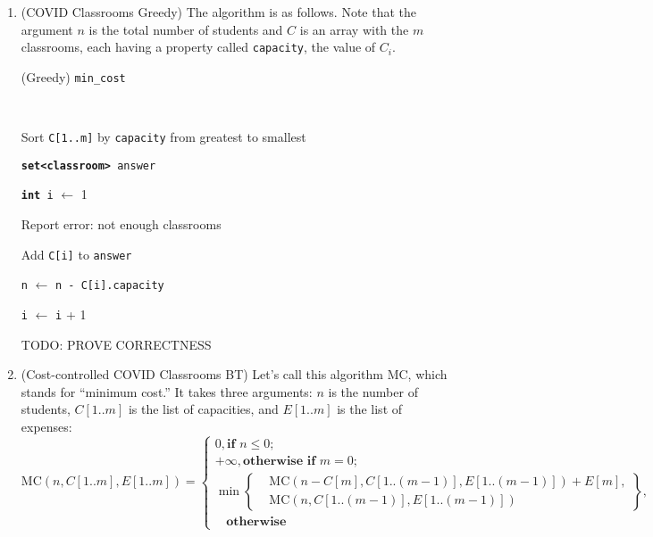 \documentclass{article}
\begin{document}
\begin{enumerate}
    \pagebreak

  \item (COVID Classrooms Greedy) The algorithm is as follows. Note that the argument $n$ is the total number of students and $C$ is an array with the $m$ classrooms, each having a property called \texttt{capacity}, the value of $C_i$.

    \begin{center}
      \begin{minipage}{0.6667\linewidth}
        \renewcommand{\thealgocf}{}
        \begin{algorithm}[H]
          \caption{(Greedy) \texttt{min\_cost}}

          \texttt{\\}

          Sort \texttt{C[1..m]} by \texttt{capacity} from greatest to smallest

          \texttt{\textbf{set<classroom>} answer}

          \texttt{\textbf{int} i} $\gets$ 1

          {
            {
              Report error: not enough classrooms
            }

            Add \texttt{C[i]} to \texttt{answer}

            \texttt{n} $\gets$ \texttt{n - C[i].capacity}

            \texttt{i} $\gets$ \texttt{i} + 1
          }

        \end{algorithm}
      \end{minipage}
    \end{center}

    TODO: PROVE CORRECTNESS

    \pagebreak

  \item (Cost-controlled COVID Classrooms BT) Let's call this algorithm MC, which stands for ``minimum cost.'' It takes three arguments: $n$ is the number of students, $C[1..m]$ is the list of capacities, and $E[1..m]$ is the list of expenses:
    $$
      \text{MC}(n, C[1..m], E[1..m]) = \begin{cases}
        0, \textbf{if }n \le 0;                       \\
        +\infty, \textbf{otherwise if }m = 0;         \\
        \min\left\{\begin{aligned}
           & \text{MC}(n - C[m], C[1..(m-1)], E[1..(m-1)]) + E[m], \\
           & \text{MC}(n, C[1..(m-1)], E[1..(m-1)])
        \end{aligned}\right\}, \\
        \ \ \ \ \textbf{otherwise}
      \end{cases}
    $$


\end{enumerate}
\end{document}
